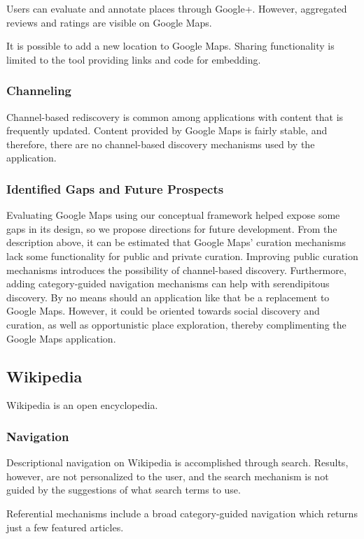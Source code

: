 {{{Users can evaluate and annotate places through Google+. However, aggregated reviews and ratings are visible on Google Maps. 

It is possible to add a new location to Google Maps. Sharing functionality is limited to the tool providing links and code for embedding.  }
{\subsubsection{Channeling}
Channel-based rediscovery is common among applications with content that is frequently updated. Content provided by Google Maps is fairly stable, and therefore, there are no channel-based discovery mechanisms used by the application.
}%
{\subsubsection{Identified Gaps and Future Prospects}
Evaluating Google Maps using our conceptual framework helped expose some gaps in its design, so we propose directions for future development. From the description above, it can be estimated that Google Maps' curation mechanisms lack some functionality for public and private curation. Improving public curation mechanisms introduces the possibility of channel-based discovery. Furthermore, adding category-guided navigation mechanisms can help with serendipitous discovery. By no means should an application like that be a replacement to Google Maps. However, it could be oriented towards social discovery and curation, as well as opportunistic place exploration, thereby complimenting the Google Maps application.  
}%
} %

{\subsection{Wikipedia}
Wikipedia is an open encyclopedia.

{\subsubsection{Navigation}
Descriptional navigation on Wikipedia is accomplished through search. Results, however, are not personalized to the user, and the search mechanism is not guided by the suggestions of what search terms to use.

Referential mechanisms include a broad category-guided navigation which returns just a few featured articles.

}}}
